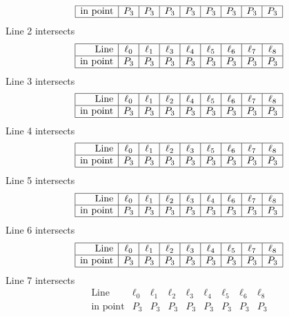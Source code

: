 \documentclass{article}
\begin{document}
{$$\begin{array}{|r*{8}{|c}|}
\hline
\mbox{in point}  & P_{3} & P_{3} & P_{3} & P_{3} & P_{3} & P_{3} & P_{3} & P_{3}\\
\hline
\end{array}
$$
Line 2 intersects 
$$
\begin{array}{|r*{8}{|c}|}
\hline
\mbox{Line}  & \ell_{0} & \ell_{1} & \ell_{3} & \ell_{4} & \ell_{5} & \ell_{6} & \ell_{7} & \ell_{8}\\
\hline
\mbox{in point}  & P_{3} & P_{3} & P_{3} & P_{3} & P_{3} & P_{3} & P_{3} & P_{3}\\
\hline
\end{array}
$$
Line 3 intersects 
$$
\begin{array}{|r*{8}{|c}|}
\hline
\mbox{Line}  & \ell_{0} & \ell_{1} & \ell_{2} & \ell_{4} & \ell_{5} & \ell_{6} & \ell_{7} & \ell_{8}\\
\hline
\mbox{in point}  & P_{3} & P_{3} & P_{3} & P_{3} & P_{3} & P_{3} & P_{3} & P_{3}\\
\hline
\end{array}
$$
Line 4 intersects 
$$
\begin{array}{|r*{8}{|c}|}
\hline
\mbox{Line}  & \ell_{0} & \ell_{1} & \ell_{2} & \ell_{3} & \ell_{5} & \ell_{6} & \ell_{7} & \ell_{8}\\
\hline
\mbox{in point}  & P_{3} & P_{3} & P_{3} & P_{3} & P_{3} & P_{3} & P_{3} & P_{3}\\
\hline
\end{array}
$$
Line 5 intersects 
$$
\begin{array}{|r*{8}{|c}|}
\hline
\mbox{Line}  & \ell_{0} & \ell_{1} & \ell_{2} & \ell_{3} & \ell_{4} & \ell_{6} & \ell_{7} & \ell_{8}\\
\hline
\mbox{in point}  & P_{3} & P_{3} & P_{3} & P_{3} & P_{3} & P_{3} & P_{3} & P_{3}\\
\hline
\end{array}
$$
Line 6 intersects 
$$
\begin{array}{|r*{8}{|c}|}
\hline
\mbox{Line}  & \ell_{0} & \ell_{1} & \ell_{2} & \ell_{3} & \ell_{4} & \ell_{5} & \ell_{7} & \ell_{8}\\
\hline
\mbox{in point}  & P_{3} & P_{3} & P_{3} & P_{3} & P_{3} & P_{3} & P_{3} & P_{3}\\
\hline
\end{array}
$$
Line 7 intersects 
$$
\begin{array}{|r*{8}{|c}|}
\hline
\mbox{Line}  & \ell_{0} & \ell_{1} & \ell_{2} & \ell_{3} & \ell_{4} & \ell_{5} & \ell_{6} & \ell_{8}\\
\hline
\mbox{in point}  & P_{3} & P_{3} & P_{3} & P_{3} & P_{3} & P_{3} & P_{3} & P_{3}\\

\end{array}$$}
\end{document}
